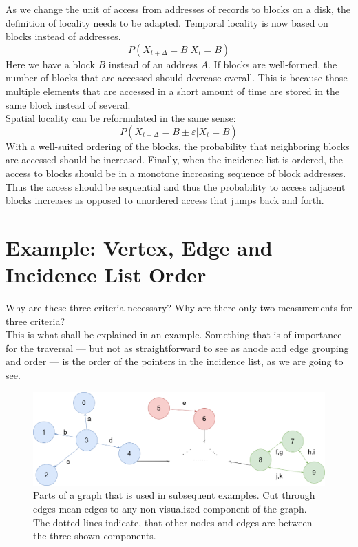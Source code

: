     As we change the unit of access from addresses of records to blocks on a disk, the definition of locality needs to be adapted.
    Temporal locality is now based on blocks instead of addresses.
     \[ P (X_{t + \Delta} = B | X_t = B) \]
     Here we have a block $B$ instead of an address $A$. 
     If blocks are well-formed, the number of blocks that are accessed should decrease overall.
     This is because those multiple elements that are accessed in a short amount of time are stored in the same block instead of several. \\
     Spatial locality can be reformulated in the same sense:
      \[ P(X_{t + \Delta} = B \pm \varepsilon | X_t = B) \]
      With a well-suited ordering of the blocks, the probability that neighboring blocks are accessed should be increased.
      Finally, when the incidence list is ordered, the access to blocks should be in a monotone increasing sequence of block addresses. 
      Thus the access should be sequential and thus the probability to access adjacent blocks increases as opposed to unordered access that jumps back and forth.
    
\section{Example: Vertex, Edge and Incidence List Order}
  Why are these three criteria necessary? Why are there only two measurements for three criteria? \\
  This is what shall be explained in an example.
  Something that is of importance for the traversal --- but not as straightforward to see as anode and edge grouping and order --- is the order of the pointers in the incidence list, as we are going to see.
  
  \begin{figure}[htp]
    \begin{center}
        \includegraphics[keepaspectratio,height=0.3\textheight,width=\textwidth]{img/05-problem_def/example_graph.png}
    \end{center}
    \caption{Parts of a graph that is used in subsequent examples. Cut through edges mean edges to any non-visualized component of the graph. The dotted lines indicate, that other nodes and edges are between the three shown components.}
    \label{ex-gr}
  \end{figure}
  
